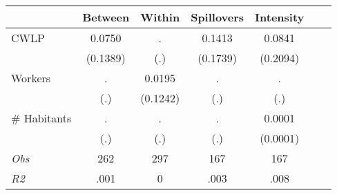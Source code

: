 \begin{tabular}{l*{6}{c}}\hline&\multicolumn{1}{c}{Between}&\multicolumn{1}{c}{Within}&\multicolumn{1}{c}{Spillovers}&\multicolumn{1}{c}{Intensity}\\ \hline 
CWLP & 0.0750 & . & 0.1413 & 0.0841 \\
 & (0.1389) & (.) & (0.1739) & (0.2094) \\
Workers & . & 0.0195 & . & . \\
 & (.) & (0.1242) & (.) & (.) \\
\# Habitants & . & . & . & 0.0001 \\
  & (.) & (.) & (.) & (0.0001) \\
\hline \textit{Obs} & 262 & 297 & 167 & 167  \\ \textit{R2} & .001 & 0 & .003 & .008 \\ \hline \end{tabular}
